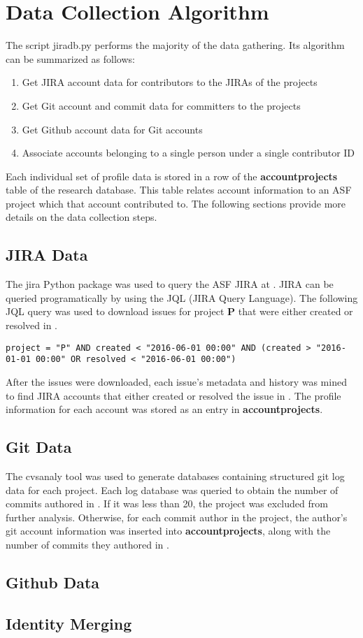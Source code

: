 \section{Data Collection Algorithm}
The script jiradb.py performs the majority of the data gathering. Its algorithm can be summarized as follows:
\begin{enumerate}
	\item Get JIRA account data for contributors to the JIRAs of the projects
	\item Get Git account and commit data for committers to the projects
	\item Get Github account data for Git accounts
	\item Associate accounts belonging to a single person under a single contributor ID
\end{enumerate}
Each individual set of profile data is stored in a row of the \textbf{accountprojects} table of the research database. This table relates account information to an ASF project which that account contributed to. The following sections provide more details on the data collection steps.

\subsection{JIRA Data}
The jira Python package was used to query the ASF JIRA at \ASFJIRAURL. JIRA can be queried programatically by using the JQL (JIRA Query Language). The following JQL query was used to download issues for project \textbf{P} that were either created or resolved in \timeperiod.
\begin{verbatim}
project = "P" AND created < "2016-06-01 00:00" AND (created > "2016-01-01 00:00" OR resolved < "2016-06-01 00:00")
\end{verbatim}
After the issues were downloaded, each issue's metadata and history was mined to find JIRA accounts that either created or resolved the issue in \timeperiod. The profile information for each account was stored as an entry in \textbf{accountprojects}.
\subsection{Git Data}
The cvsanaly tool was used to generate databases containing structured git log data for each project. Each log database was queried to obtain the number of commits authored in \timeperiod. If it was less than 20, the project was excluded from further analysis. Otherwise, for each commit author in the project, the author's git account information was inserted into \textbf{accountprojects}, along with the number of commits they authored in \timeperiod.
\subsection{Github Data}
\subsection{Identity Merging}